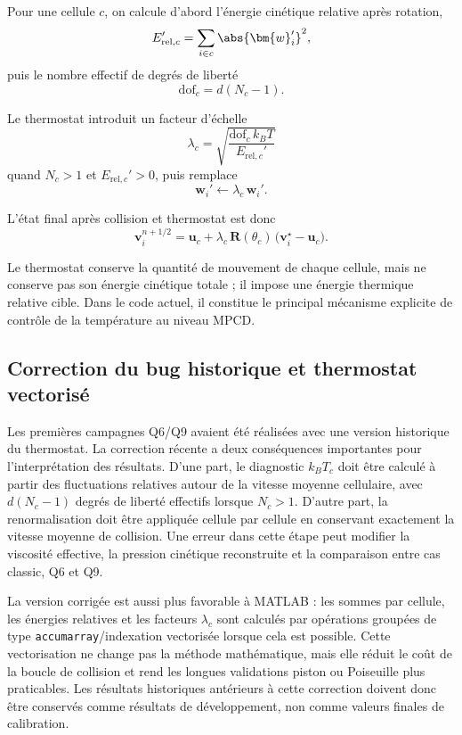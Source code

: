 \documentclass[11pt,a4paper]{article}
\begin{document}
Pour une cellule $c$, on calcule d'abord l'énergie cinétique relative après rotation,
\begin{equation}
 E_{\mathrm{rel},c}' = \sum_{i\in c} \abs{\bm{w}_i'}^2,
\end{equation}
puis le nombre effectif de degrés de liberté
\begin{equation}
 \mathrm{dof}_c = d(N_c-1).
\end{equation}

Le thermostat introduit un facteur d'échelle
\begin{equation}
 \lambda_c = \sqrt{\frac{\mathrm{dof}_c\,k_B T}{E_{\mathrm{rel},c}'}}
\end{equation}
quand $N_c>1$ et $E_{\mathrm{rel},c}'>0$, puis remplace
\begin{equation}
 \bm{w}_i' \leftarrow \lambda_c\,\bm{w}_i'.
\end{equation}

L'état final après collision et thermostat est donc
\begin{equation}
 \bm{v}_i^{n+1/2} = \bm{u}_c + \lambda_c\,\mathbf{R}(\theta_c)\,\bigl(\bm{v}_i^{\star}-\bm{u}_c\bigr).
\end{equation}

Le thermostat conserve la quantité de mouvement de chaque cellule, mais ne conserve pas son énergie cinétique totale ; il impose une énergie thermique relative cible. Dans le code actuel, il constitue le principal mécanisme explicite de contrôle de la température au niveau MPCD.


\subsection{Correction du bug historique et thermostat vectorisé}

Les premières campagnes Q6/Q9 avaient été réalisées avec une version historique du thermostat. La correction récente a deux conséquences importantes pour l'interprétation des résultats. D'une part, le diagnostic \(k_BT_c\) doit être calculé à partir des fluctuations relatives autour de la vitesse moyenne cellulaire, avec \(d(N_c-1)\) degrés de liberté effectifs lorsque \(N_c>1\). D'autre part, la renormalisation doit être appliquée cellule par cellule en conservant exactement la vitesse moyenne de collision. Une erreur dans cette étape peut modifier la viscosité effective, la pression cinétique reconstruite et la comparaison entre cas classic, Q6 et Q9.

La version corrigée est aussi plus favorable à MATLAB : les sommes par cellule, les énergies relatives et les facteurs \(\lambda_c\) sont calculés par opérations groupées de type \texttt{accumarray}/indexation vectorisée lorsque cela est possible. Cette vectorisation ne change pas la méthode mathématique, mais elle réduit le coût de la boucle de collision et rend les longues validations piston ou Poiseuille plus praticables. Les résultats historiques antérieurs à cette correction doivent donc être conservés comme résultats de développement, non comme valeurs finales de calibration.
\end{document}
